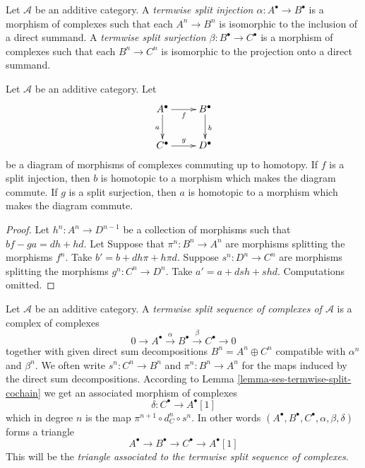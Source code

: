 \begin{definition}
\label{definition-termwise-split-map}
Let $\mathcal{A}$ be an additive category.
A {\it termwise split injection $\alpha : A^\bullet \to B^\bullet$}
is a morphism of complexes such that each $A^n \to B^n$
is isomorphic to the inclusion of a direct summand.
A {\it termwise split surjection $\beta : B^\bullet \to C^\bullet$}
is a morphism of complexes such that each $B^n \to C^n$
is isomorphic to the projection onto a direct summand.
\end{definition}

\begin{lemma}
\label{lemma-make-commute-map}
Let $\mathcal{A}$ be an additive category.
Let
$$
\xymatrix{
A^\bullet \ar[r]_f \ar[d]_a & B^\bullet \ar[d]^b \\
C^\bullet \ar[r]^g & D^\bullet
}
$$
be a diagram of morphisms of complexes commuting up to homotopy.
If $f$ is a split injection, then $b$ is homotopic to a
morphism which makes the diagram commute.
If $g$ is a split surjection, then $a$ is homotopic to a
morphism which makes the diagram commute.
\end{lemma}

\begin{proof}
Let $h^n : A^n \to D^{n - 1}$ be a collection of morphisms
such that $bf - ga = dh + hd$. Let
Suppose that $\pi^n : B^n \to A^n$
are morphisms splitting the morphisms $f^n$.
Take $b' = b + dh\pi + h\pi d$.
Suppose $s^n : D^n \to C^n$ are morphisms splitting the morphisms
$g^n : C^n \to D^n$. Take $a' = a + dsh + shd$.
Computations omitted.
\end{proof}

\begin{definition}
\label{definition-split-ses}
Let $\mathcal{A}$ be an additive category.
A {\it termwise split sequence of complexes of $\mathcal{A}$}
is a complex of complexes
$$
0 \to
A^\bullet \xrightarrow{\alpha}
B^\bullet \xrightarrow{\beta}
C^\bullet \to 0
$$
together with given direct sum decompositions
$B^n = A^n \oplus C^n$
compatible with $\alpha^n$ and $\beta^n$.
We often write $s^n : C^n \to B^n$ and $\pi^n : B^n \to A^n$
for the maps induced by the direct sum decompositions.
According to Lemma \ref{lemma-ses-termwise-split-cochain}
we get an associated morphism of complexes
$$
\delta : C^\bullet \longrightarrow A^\bullet[1]
$$
which in degree $n$ is the map $\pi^{n + 1} \circ d_C^n \circ s^n$.
In other words
$(A^\bullet, B^\bullet, C^\bullet, \alpha, \beta, \delta)$
forms a triangle
$$
A^\bullet \to B^\bullet \to C^\bullet \to A^\bullet[1]
$$
This will be the {\it triangle associated to the termwise
split sequence of complexes}.
\end{definition}

